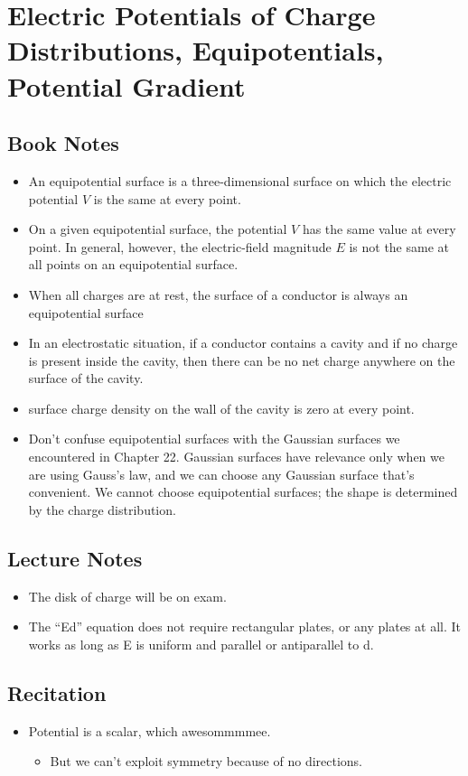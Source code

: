 \documentclass[11pt]{article}
\newcommand{\chapterTitle}{Electric Potentials of Charge Distributions, Equipotentials, Potential Gradient}
\begin{document}
\section{\chapterTitle}

\subsection{Book Notes}
\begin{itemize}
    \item An equipotential  surface is a three-dimensional surface on which the electric potential $V$ is the same at every point.
    \item On a given equipotential surface, the potential $V$ has the same value at every point. In general, however, the electric-field magnitude $E$ is not the same at all points on an equipotential surface.
    \item When all charges are at rest, the surface of a conductor is always an equipotential surface
    \item In an electrostatic situation, if a conductor contains a cavity and if no charge is present inside the cavity, then there can be no net charge anywhere on the surface of the cavity.
    \item surface charge density on the wall of the cavity is zero at every point.
    \item Don’t confuse equipotential surfaces with the Gaussian surfaces we encountered in Chapter 22. Gaussian surfaces have relevance only when we are using Gauss’s law, and we can choose any Gaussian surface that’s convenient. We cannot choose equipotential surfaces; the shape is determined by the charge distribution.
\end{itemize}

\subsection{Lecture Notes}
\begin{itemize}
    \item The disk of charge will be on exam.
    \item The ``Ed'' equation does not require rectangular plates, or any plates at all. It works as long as E is uniform and parallel or antiparallel to d.
\end{itemize}

\subsection{Recitation}
\begin{itemize}
    \item Potential is a scalar, which awesommmmee.
    \begin{itemize}
        \item But we can't exploit symmetry because of no directions.
    \end{itemize}
\end{itemize}
\end{document}
